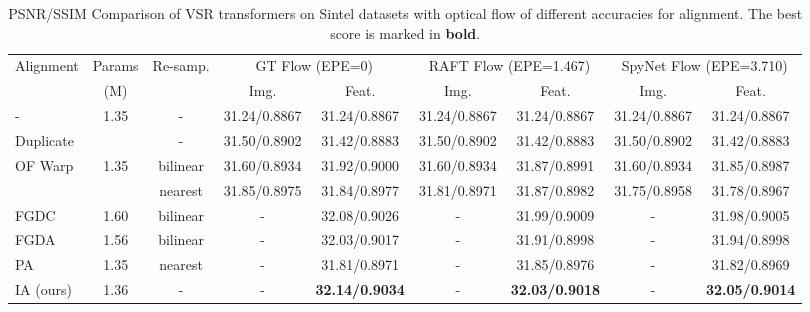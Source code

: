 \documentclass[10pt,twocolumn,letterpaper]{article}
\begin{document}
\begin{table*}[]
\small
\centering
\begin{tabular}{l|c|c|c c|c c|c c}

\toprule
\multirow{2}{*}{Alignment} & Params &\multirow{2}{*}{Re-samp.} &\multicolumn{2}{c|}{GT Flow (EPE=0)} & \multicolumn{2}{c|}{RAFT Flow (EPE=1.467)}      & \multicolumn{2}{c}{SpyNet Flow (EPE=3.710)}                                \\
 & (M) &  &Img. & Feat. &Img. & Feat. &Img. & Feat.\\
\midrule
-                               &\multirow{2}{*}{1.35}  & -                     & 31.24/0.8867  & 31.24/0.8867  & 31.24/0.8867  & 31.24/0.8867  & 31.24/0.8867  & 31.24/0.8867 \\
 Duplicate                      && -                                            & 31.50/0.8902  & 31.42/0.8883  & 31.50/0.8902  & 31.42/0.8883  & 31.50/0.8902  & 31.42/0.8883 \\
 \midrule
\multirow{2}{*}{OF Warp}        &\multirow{2}{*}{1.35}& bilinear                & 31.60/0.8934  & 31.92/0.9000  & 31.60/0.8934  & 31.87/0.8991  & 31.60/0.8934  & 31.85/0.8987  \\
                                
                                && nearest                                      & 31.85/0.8975  & 31.84/0.8977  & 31.81/0.8971  & 31.87/0.8982  & 31.75/0.8958  & 31.78/0.8967  \\
                                
\midrule
FGDC \cite{wang2019edvr}        &1.60& bilinear                                  &       -       & 32.08/0.9026  &       -       & 31.99/0.9009  &       -       & 31.98/0.9005  \\
FGDA \cite{liang2022recurrent_rvrt}  &1.56& bilinear                             &       -       & 32.03/0.9017  &       -       & 31.91/0.8998  &       -       & 31.94/0.8998  \\
PA \cite{shi2022rethinking}     &1.35& nearest                                   &       -       & 31.81/0.8971  &       -       & 31.85/0.8976  &       -       & 31.82/0.8969  \\
IA (ours)                      &1.36&  -                                            &       -       & \textbf{32.14/0.9034}  &       -       & \textbf{32.03/0.9018}  &       -       & \textbf{32.05/0.9014}  \\
\bottomrule
\end{tabular}
\vspace{-0.1cm}
\caption{PSNR/SSIM Comparison of VSR transformers on Sintel datasets with optical flow of different accuracies for alignment. The best score is marked in \textbf{bold}.}\label{tab:sintel_vsr}
\vspace{-1em}
\end{table*}
\end{document}
